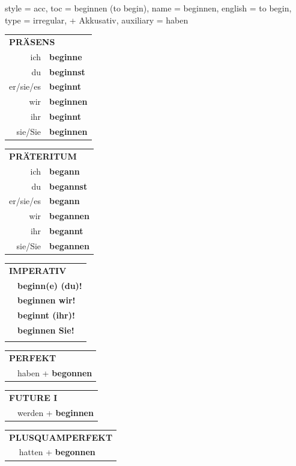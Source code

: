 \begin{verbentry}{
  style = {acc},
  toc = {beginnen (to begin)},
  name = {beginnen},
  english = {to begin},
  type = {irregular, + Akkusativ},
  auxiliary = {haben}
}
  \begin{tabular}{rl}
     \multicolumn{2}{l}{\textbf{PRÄSENS} }\\
    ich & \textbf{beginne}\\
    du & \textbf{beginnst}\\
    er/sie/es & \textbf{beginnt}\\
    wir & \textbf{beginnen}\\
    ihr & \textbf{beginnt}\\
    sie/Sie & \textbf{beginnen}\\
  \end{tabular}
  \hfill
     \begin{tabular}{rl}
    \multicolumn{2}{l}{\textbf{PRÄTERITUM} }\\
    ich & \textbf{begann}\\
    du & \textbf{begannst}\\
    er/sie/es & \textbf{begann}\\
    wir & \textbf{begannen}\\
    ihr & \textbf{begannt}\\
    sie/Sie & \textbf{begannen}\\
  \end{tabular}
  \hfill
  \begin{tabular}{rl}
     \multicolumn{2}{l}{\textbf{IMPERATIV} }\\
   & \textbf{beginn(e) (du)!}\\
   & \textbf{beginnen wir!}\\
   & \textbf{beginnt (ihr)!}\\
   & \textbf{beginnen Sie!}\\
   & \vspace{10pt}
  \end{tabular}

    \vspace{10pt}

 \begin{tabular}{rl}
     \multicolumn{2}{l}{\textbf{PERFEKT}}\\
  &  haben + \textbf{begonnen}\\
  \end{tabular}
\hfill
   \begin{tabular}{rl}
   
    \multicolumn{2}{l}{\textbf{FUTURE I} }\\
  &  werden + \textbf{beginnen}\\
 
  \end{tabular}
\hfill
   \begin{tabular}{rl}
      \multicolumn{2}{l}{\textbf{PLUSQUAMPERFEKT}}\\
   & hatten + \textbf{begonnen}\\
  \end{tabular}
  

\end{verbentry}
